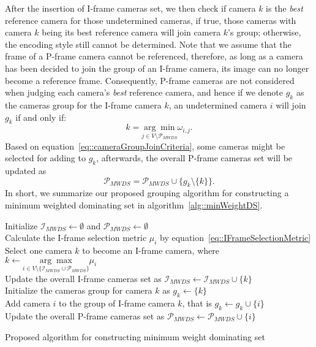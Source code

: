 After the insertion of I-frame cameras set, we then check if camera $k$ is the \emph{best} reference camera for those undetermined cameras, if true, those cameras with camera $k$ being its best reference camera will join camera $k$'s group; otherwise, the encoding style still cannot be determined.
Note that we assume that the frame of a P-frame camera cannot be referenced, therefore, as long as a camera has been decided to join the group of an I-frame camera, its image can no longer become a reference frame.
Consequently, P-frame cameras are not considered when judging each camera's \emph{best} reference camera, and hence if we denote $g_k$ as the cameras group for the I-frame camera $k$, an undetermined camera $i$ will join $g_k$ if and only if:
\begin{equation}
k = \underset{j \in V \setminus \mathcal{P}_{MWDS}}{\arg \min} \omega_{i,j}.
\label{eq::cameraGroupJoinCriteria}
\end{equation}
Based on equation~\eqref{eq::cameraGroupJoinCriteria}, some cameras might be selected for adding to $g_k$, afterwards, the overall P-frame cameras set will be updated as
\begin{equation}
\mathcal{P}_{MWDS} = \mathcal{P}_{MWDS} \cup \{ g_k \setminus \{k\} \}.
\label{eq::updatePCamsSet}
\end{equation}
In short, we summarize our proposed grouping algorithm for constructing a minimum weighted dominating set in algorithm~\ref{alg::minWeightDS}.
%
\IncMargin{1em}
\begin{algorithm}[]
 \SetAlgoLined
 \BlankLine
 Initialize $\mathcal{I}_{MWDS} \gets \emptyset$ and $\mathcal{P}_{MWDS} \gets \emptyset$ \\
 {
 	{
 		Calculate the I-frame selection metric $\mu_i$ by equation~\eqref{eq::IFrameSelectionMetric} \\
 	}
 	Select one camera $k$ to become an I-frame camera, where $k \gets \underset{i \in V \setminus \{ \mathcal{I}_{MWDS} \cup \mathcal{P}_{MWDS} \} }{\arg \max} \mu_i$ \\
 	Update the overall I-frame cameras set as $\mathcal{I}_{MWDS} \gets \mathcal{I}_{MWDS} \cup \{ k \}$ \\
 	Initialize the cameras group for camera $k$ as $g_k \gets \{ k \}$ \\
 	{
 		{
 			Add camera $i$ to the group of I-frame camera $k$, that is $g_k \gets g_k \cup \{ i \}$ \\
 			Update the overall P-frame cameras set as $\mathcal{P}_{MWDS} \gets \mathcal{P}_{MWDS} \cup \{ i \}$ \\
 		}
 	}
 }
 \caption{\label{alg::minWeightDS}Proposed algorithm for constructing minimum weight dominating set}
\end{algorithm}
